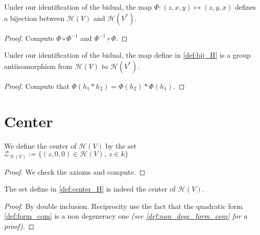\begin{definition}
    \label{def:bij_H}
    \leanok 

    Under our identification of the bidual, the map
    $\Phi : (z,x,y) \mapsto (z,y,x)$ defines a bijection 
    between $\mathcal{H}(V)$ and $\mathcal{H}(V^*)$.
    \begin{proof}
        \leanok
        Compute $\Phi\circ\Phi^{-1}$ and $\Phi^{-1}\circ\Phi$.
    \end{proof}
\end{definition}

\begin{definition}
    \label{prop:antiisoH}
    \leanok 

    Under our identification of the bidual, the map define in \ref{def:bij_H} is
    a group antiisomorphism from $\mathcal{H}(V)$ to $\mathcal{H}(V^*)$.
    \begin{proof}
        \leanok
        Compute that $\Phi(h_1*h_2)=\Phi(h_2)*\Phi(h_1)$.
    \end{proof}
\end{definition}

\section{Center}

\begin{proposition}
    \label{prop:center_H_subgroup}
    \leanok

    We define the center of $\mathcal{H}(V)$ by the set
    $\mathcal{Z}_{\mathcal{H}(V)}:=\{(z,0,0)\in\mathcal{H}(V),\ z\in k\}$
\end{proposition}
\begin{proof}
    \leanok
    We check the axioms and compute.
\end{proof}

\begin{proposition}
    \label{prop:center_H_is_center}
    \leanok

    The set define in \ref{def:center_H} is indeed the center of $\mathcal{H}(V)$.
\end{proposition}
\begin{proof}
    \leanok
    By double inclusion. Reciprocity use the fact that the quadratic form \ref{def:form_com}
    is a non degeneracy one \textit{(see \ref{def:non_dege_form_com} for a proof)}.
\end{proof}

